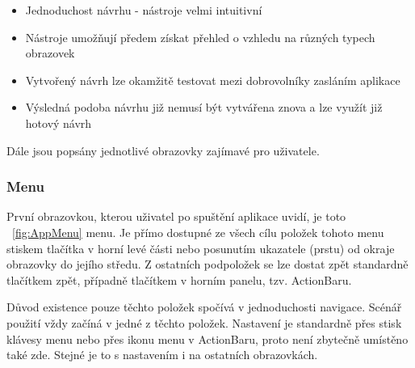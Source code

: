 \documentclass[thesis=B,czech]{FITthesis}[2013/10/20]
\begin{document}
\begin{itemize}
  \item{Jednoduchost návrhu - nástroje velmi intuitivní}
  \item{Nástroje umožňují předem získat přehled o vzhledu na různých typech obrazovek}
  \item{Vytvořený návrh lze okamžitě testovat mezi dobrovolníky zasláním aplikace}
  \item{Výsledná podoba návrhu již nemusí být vytvářena znova a lze využít již hotový návrh}
\end{itemize}

Dále jsou popsány jednotlivé obrazovky zajímavé pro uživatele.

\subsubsection{Menu}

První obrazovkou, kterou uživatel po spuštění aplikace uvidí, je toto ~\ref{fig:AppMenu} menu. Je přímo dostupné ze všech cílu položek tohoto menu stiskem tlačítka v horní levé části nebo posunutím ukazatele (prstu) od okraje obrazovky do jejího středu. Z ostatních podpoložek se lze dostat zpět standardně tlačítkem zpět, případně tlačítkem v horním panelu, tzv. ActionBaru.

Důvod existence pouze těchto položek spočívá v jednoduchosti navigace. Scénář použití vždy začíná v jedné z těchto položek. Nastavení je standardně přes stisk klávesy menu nebo přes ikonu menu v ActionBaru, proto není zbytečně umístěno také zde. Stejné je to s nastavením i na ostatních obrazovkách.
\end{document}
